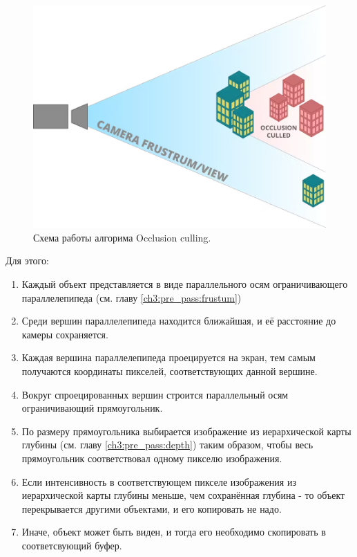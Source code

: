 		\begin{figure}[ht!] 
			\center
			\includegraphics [scale=0.27] {my_folder/images//occlusion_culling}	
			\caption{Схема работы алгорима Occlusion culling.} 
			\label{fig:occlusion_culling}
		\end{figure}
		
		Для этого:
		\begin{enumerate}[1.]
			\item Каждый объект представляется в виде параллельного осям ограничивающего параллелепипеда (см. главу \ref{ch3:pre_pass:frustum})
		 	\item Среди вершин параллелепипеда находится ближайшая, и её расстояние до камеры сохраняется.
		 	\item Каждая вершина параллелепипеда проецируется на экран, тем самым получаются координаты пикселей, соответствующих данной вершине.
		 	\item Вокруг спроецированных вершин строится параллельный осям ограничивающий прямоугольник.
		 	\item По размеру прямоугольника выбирается изображение из иерархической карты глубины (см. главу \ref{ch3:pre_pass:depth}) таким образом, чтобы весь прямоугольник соответствовал одному пикселю изображения.
		 	\item Если интенсивность в соответствующем пикселе изображения из иерархической карты глубины меньше, чем сохранённая глубина - то объект перекрывается другими объектами, и его копировать не надо. 
		 	\item Иначе, объект может быть виден, и тогда его необходимо скопировать в соответсвующий буфер. 
		\end{enumerate}
		
